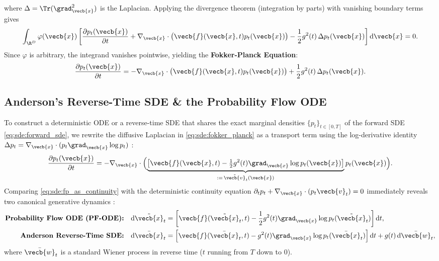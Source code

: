 \documentclass[../../../../master.tex]{subfiles}
\begin{document}
\begin{coremath}
\begin{equation}
\end{equation}
where $\Delta = \Tr(\grad_{\vecb{x}}^2)$ is the Laplacian. Applying the divergence theorem (integration by parts) with vanishing boundary terms gives
\begin{equation}\label{eq:sde:fp_ibp}
  \int_{\R^D} \varphi(\vecb{x}) \left[ \frac{\partial p_t(\vecb{x})}{\partial t} + \nabla_{\vecb{x}} \cdot \bigl(\vecb{f}(\vecb{x}, t) p_t(\vecb{x})\bigr) - \frac{1}{2}g^2(t)\,\Delta p_t(\vecb{x}) \right] \mathrm{d}\vecb{x} = 0.
\end{equation}
Since $\varphi$ is arbitrary, the integrand vanishes pointwise, yielding the \textbf{Fokker-Planck Equation}:
\begin{equation}\label{eq:sde:fokker_planck}
  \frac{\partial p_t(\vecb{x})}{\partial t} = -\nabla_{\vecb{x}} \cdot \bigl(\vecb{f}(\vecb{x}, t) p_t(\vecb{x})\bigr) + \frac{1}{2}g^2(t)\,\Delta p_t(\vecb{x}).
\end{equation}
\end{coremath}

\subsection{Anderson's Reverse-Time SDE \& the Probability Flow ODE}\label{sec:sde:anderson_pfode}

To construct a deterministic ODE or a reverse-time SDE that shares the exact marginal densities $\{p_t\}_{t \in [0, T]}$ of the forward SDE \eqref{eq:sde:forward_sde}, we rewrite the diffusive Laplacian in \eqref{eq:sde:fokker_planck} as a transport term using the log-derivative identity $\Delta p_t = \nabla_{\vecb{x}} \cdot (p_t \grad_{\vecb{x}}\log p_t)$ :
\begin{equation}\label{eq:sde:fp_as_continuity}
  \frac{\partial p_t(\vecb{x})}{\partial t} = -\nabla_{\vecb{x}} \cdot \Bigl( \underbrace{\bigl[\vecb{f}(\vecb{x}, t) - \tfrac{1}{2}g^2(t)\grad_{\vecb{x}}\log p_t(\vecb{x})\bigr]}_{:=\,\tilde{\vecb{v}}_t(\vecb{x})} p_t(\vecb{x}) \Bigr).
\end{equation}
Comparing \eqref{eq:sde:fp_as_continuity} with the deterministic continuity equation $\partial_t p_t + \nabla_{\vecb{x}}\cdot(p_t \vecb{v}_t) = 0$ immediately reveals two canonical generative dynamics  :
\begin{align}
  \textbf{Probability Flow ODE (PF-ODE):}\quad & \mathrm{d}\tilde{\vecb{x}}_t = \left[\vecb{f}(\tilde{\vecb{x}}_t, t) - \frac{1}{2}g^2(t)\grad_{\vecb{x}}\log p_t(\tilde{\vecb{x}}_t)\right]\mathrm{d}t, \label{eq:sde:pf_ode} \\
  \textbf{Anderson Reverse-Time SDE:}\quad & \mathrm{d}\bar{\vecb{x}}_t = \left[\vecb{f}(\bar{\vecb{x}}_t, t) - g^2(t)\grad_{\vecb{x}}\log p_t(\bar{\vecb{x}}_t)\right]\mathrm{d}t + g(t)\,\mathrm{d}\bar{\vecb{w}}_t, \label{eq:sde:reverse_sde}
\end{align}
where $\bar{\vecb{w}}_t$ is a standard Wiener process in reverse time ($t$ running from $T$ down to $0$).
\end{document}
